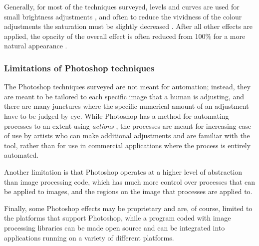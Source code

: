 \begin{table}[H]
\begin{tabular}{|c|c|c|}
\begin{minipage}{.29\textwidth}
  \end{minipage} \\
    \hline
\end{tabular}
\end{table}

Generally, for most of the techniques surveyed, levels and curves are used for small brightness adjustments \cite{photoshop:obama, photoshop:match_body, photoshop:match_other}, and often to reduce the vividness of the colour adjustments the saturation must be slightly decreased \cite{photoshop:obama, photoshop:match_body}. After all other effects are applied, the opacity of the overall effect is often reduced from 100\% for a more natural appearance \cite{photoshop:obama, photoshop:match_body}.

\subsubsection*{Limitations of Photoshop techniques}
The Photoshop techniques surveyed are not meant for automation; instead, they are meant to be tailored to each specific image that a human is adjusting, and there are many junctures where the specific numerical amount of an adjustment have to be judged by eye. While Photoshop has a method for automating processes to an extent using \textit{actions} \cite{photoshop:actions}, the processes are meant for increasing ease of use by artists who can make additional adjustments and are familiar with the tool, rather than for use in commercial applications where the process is entirely automated.

Another limitation is that Photoshop operates at a higher level of abstraction than image processing code, which has much more control over processes that can be applied to images, and the regions on the image that processes are applied to. 

Finally, some Photoshop effects may be proprietary and are, of course, limited to the platforms that support Photoshop, while a program coded with image processing libraries can be made open source and can be integrated into applications running on a variety of different platforms.